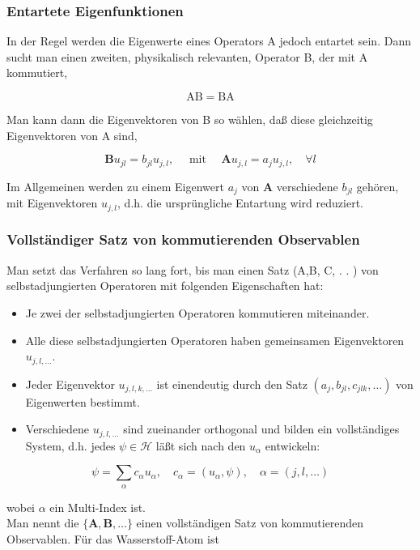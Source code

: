 \documentclass[10pt, letterpaper]{article}
\begin{document}
\subsubsection*{Entartete Eigenfunktionen}
In der Regel werden die Eigenwerte eines Operators A jedoch entartet sein. Dann sucht man einen zweiten, physikalisch relevanten, Operator B, der mit A kommutiert,

$$
\mathrm{AB}=\mathrm{BA}
$$

Man kann dann die Eigenvektoren von B so wählen, daß diese gleichzeitig Eigenvektoren von A sind,

$$
\mathbf{B} u_{j l}=b_{j l} u_{j, l}, \quad \text { mit } \quad \mathbf{A} u_{j, l}=a_{j} u_{j, l}, \quad \forall l
$$

Im Allgemeinen werden zu einem Eigenwert $a_{j}$ von $\mathbf{A}$ verschiedene $b_{j l}$ gehören, mit Eigenvektoren $u_{j, l}$, d.h. die ursprüngliche Entartung wird reduziert.

\subsubsection*{Vollständiger Satz von kommutierenden Observablen}
Man setzt das Verfahren so lang fort, bis man einen Satz (A,B, C, . . ) von selbstadjungierten Operatoren mit folgenden Eigenschaften hat:

\begin{itemize}
  \item Je zwei der selbstadjungierten Operatoren kommutieren miteinander.
  \item Alle diese selbstadjungierten Operatoren haben gemeinsamen Eigenvektoren $u_{j, l, \ldots}$.
  \item Jeder Eigenvektor $u_{j, l, k, \ldots}$ ist einendeutig durch den Satz $\left(a_{j}, b_{j l}, c_{j l k}, \ldots\right)$ von Eigenwerten bestimmt.
  \item Verschiedene $u_{j, l, \ldots}$ sind zueinander orthogonal und bilden ein vollständiges System, d.h. jedes $\psi \in \mathcal{H}$ läßt sich nach den $u_{\alpha}$ entwickeln:
\end{itemize}

$$
\psi=\sum_{\alpha} c_{\alpha} u_{\alpha}, \quad c_{\alpha}=\left(u_{\alpha}, \psi\right), \quad \alpha=(j, l, \ldots)
$$

wobei $\alpha$ ein Multi-Index ist.\\
Man nennt die $\{\mathbf{A}, \mathbf{B}, \ldots\}$ einen vollständigen Satz von kommutierenden Observablen. Für das Wasserstoff-Atom ist
\end{document}
